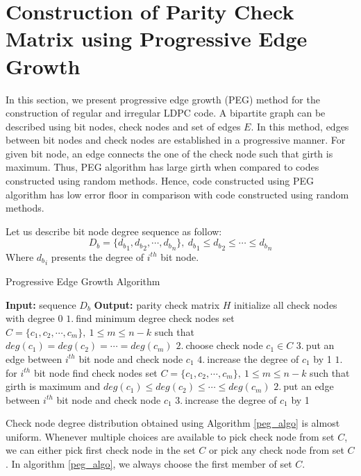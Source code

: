 \section{Construction of Parity Check Matrix using Progressive Edge Growth}
In this section, we present progressive edge growth (PEG) method for the construction of regular and irregular LDPC code. 
A bipartite graph can be described using bit nodes, check nodes and set of edges $E$. In this method, edges between bit nodes and check nodes are 
established in a progressive manner. For given bit node, an edge connects the one of the check node such that girth is maximum. 
Thus, PEG algorithm has large girth when compared to codes constructed using random methods. 
Hence, code constructed using PEG algorithm has low error floor in comparison with code constructed using random methods.

Let us describe bit node degree sequence as follow:
\begin{equation*}
 D_b=\{{d_b}_1,{d_b}_2,\cdots,{d_b}_n\},~ {d_b}_1 \leq {d_b}_2 \leq \cdots \leq {d_b}_n
\end{equation*}
%
Where ${d_b}_i$ presents the degree of $i^{th}$ bit node.

\begin{algorithm}[H]
\caption{Progressive Edge Growth Algorithm\cite{peg}}
\label{peg_algo}
\begin{algorithmic}[1]
\State \textbf{Input:} sequence $D_b$
\State \textbf{Output:} parity check matrix $H$
\State initialize all check nodes with degree $0$
\State $1.~$find minimum degree check nodes set $C=\{c_1,c_2,\cdots,c_m\},~ 1 \leq m\leq n-k$ such that $deg(c_1)=deg(c_2)=\cdots=deg(c_m)$
\State $2.~$choose check node $c_1 \in C$
\State $3.~$put an edge between $i^{th}$ bit node and check node $c_1$
\State $4.~$increase the degree of $c_1$ by 1
\Else
\State $1.~$for $i^{th}$ bit node find check nodes set $C=\{c_1,c_2,\cdots,c_m\},~1\leq m\leq n-k$ such that girth is maximum and $deg(c_1) \leq deg(c_2) \leq \cdots \leq deg(c_m)$
\State $2.~$put an edge between $i^{th}$ bit node and check node $c_1$ 
\State $3.~$increase the degree of $c_1$ by 1
\EndIf
\EndFor
\EndFor
\end{algorithmic}
\end{algorithm}
%
Check node degree distribution obtained using Algorithm \ref{peg_algo} is almost uniform. Whenever multiple choices are available to 
pick check node from set $C$, we can either pick first check node in the set $C$ or pick any check node from set $C$. 
In algorithm \ref{peg_algo}, we always choose the first member of set $C$.